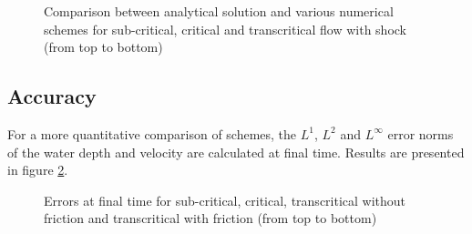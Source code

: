 \begin{figure}[H]
\begin{minipage}[t]{0.5\textwidth}
 \centering
\end{minipage}%
\begin{minipage}[t]{0.5\textwidth}
 \centering
\end{minipage}
\begin{minipage}[t]{0.5\textwidth}
 \centering
\end{minipage}%
\begin{minipage}[t]{0.5\textwidth}
 \centering
\end{minipage}
\begin{minipage}[t]{0.5\textwidth}
 \centering
\end{minipage}%
\begin{minipage}[t]{0.5\textwidth}
 \centering
\end{minipage}
 \caption{Comparison between analytical solution and various  numerical schemes
 for sub-critical, critical and transcritical flow with shock (from top to bottom)}\label{fig:bumpsub:fig:comp}
\end{figure}

\subsection{Accuracy}

For a more quantitative comparison of schemes, the $L^1$, $L^2$ and $L^\infty$ error norms 
of the water depth and velocity are calculated at final time. 
Results are presented in figure \ref{fig:bump:errors}.

\begin{figure}[H]
  \centering
  \caption{Errors at final time for sub-critical, critical, transcritical without friction and transcritical with friction (from top to bottom)}\label{fig:bump:errors}
\end{figure}


